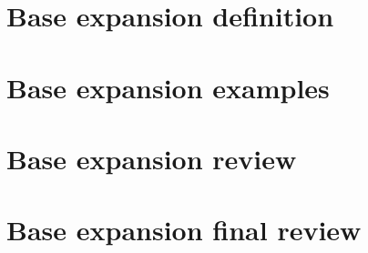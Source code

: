 
\section*{Base expansion definition}

\vfill
\section*{Base expansion examples}

\vfill
\section*{Base expansion review}

\vfill
\section*{Base expansion final review}

\vfill
